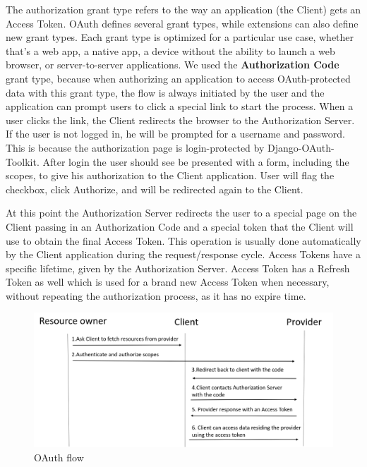 The authorization grant type refers to the way an application (the Client) gets an Access Token. OAuth defines several grant types, while extensions can also define new grant types. Each grant type is optimized for a particular use case, whether that’s a web app, a native app, a device without the ability to launch a web browser, or server-to-server applications. We used the \textbf{Authorization Code} grant type, because when authorizing an application to access OAuth-protected data with this grant type, the flow is always initiated by the user and the application can prompt users to click a special link to start the process.
When a user clicks the link, the Client redirects the browser to the Authorization Server. If the user is not logged in, he will be prompted for a username and password. This is because the authorization page is login-protected by Django-OAuth-Toolkit. After login the user should see be presented with a form, including the scopes, to give his authorization to the Client application. User will flag the checkbox, click Authorize, and will be redirected again to the Client.

At this point the Authorization Server redirects the user to a special page on the Client passing in an Authorization Code and a special token that the Client will use to obtain the final Access Token. This operation is usually done automatically by the Client application during the request/response cycle. Access Tokens have a specific lifetime, given by the Authorization Server. Access Token has a Refresh Token as well which is used for a brand new Access Token when necessary, without repeating the authorization process, as it has no expire time.

\begin{figure}[htb]
	\centering
	\includegraphics[scale=0.3]{figures/oauth.png}
	\caption{OAuth flow}\label{oauth-flow}
\end{figure}

